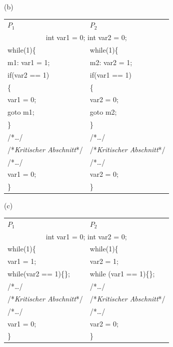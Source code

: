 \documentclass[fleqn]{article}
\begin{document}
(b)

\begin{center}
    \begin{tabular}{l|l}
        $P_1$&$P_2$\\
        \multicolumn{2}{c}{int var1 = 0; int var2 = 0;}\\
        while(1)\{&while(1)\{\\
        \qquad m1: var1 = 1;&\qquad m2: var2 = 1;\\
        \qquad if(var2 == 1)&\qquad if(var1 == 1)\\
        \qquad \{&\qquad \{\\
        \qquad\qquad var1 = 0;&\qquad\qquad var2 = 0;\\
        \qquad\qquad goto m1;&\qquad\qquad goto m2;\\
        \qquad \}&\qquad \}\\
        \qquad /*\dots*/&\qquad /*\dots*/\\
        \qquad /*\textit{Kritischer Abschnitt}*/&\qquad /*\textit{Kritischer Abschnitt}*/\\
        \qquad /*\dots*/&\qquad /*\dots*/\\
        \qquad var1 = 0;&\qquad var2 = 0;\\
        \}&\}
    \end{tabular}
\end{center}

(c)

\begin{center}
    \begin{tabular}{l|l}
        $P_1$&$P_2$\\
        \multicolumn{2}{c}{int var1 = 0; int var2 = 0;}\\
        while(1)\{&while(1)\{\\
        \qquad var1 = 1;&\qquad var2 = 1;\\
        \qquad while(var2 == 1)\{\};&\qquad while (var1 == 1)\{\};\\
        \qquad /*\dots*/&\qquad /*\dots*/\\
        \qquad /*\textit{Kritischer Abschnitt}*/&\qquad /*\textit{Kritischer Abschnitt}*/\\
        \qquad /*\dots*/&\qquad /*\dots*/\\
        \qquad var1 = 0;&\qquad var2 = 0;\\
        \}&\}
    \end{tabular}
\end{center}
\end{document}
